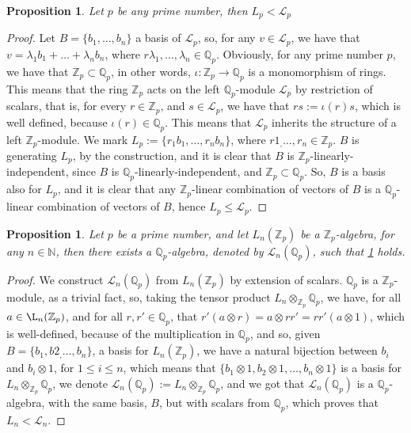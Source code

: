 \documentclass[12pt]{article}
\newtheorem{proposition}[theorem]{Proposition}
\begin{document}
\begin{proposition}
\label{prop.integers.subalgebra.rationals}
Let $p$ be any prime number, then $L_p<\mathcal{L}_p$
\end{proposition}
\begin{proof}
Let $B=\{b_1,\dots,b_n\}$ a basis of $\mathcal{L}_p$, so, for any $v\in\mathcal{L}_p$, we have that $v=\lambda_1b_1+\dots+\lambda_nb_n$, where $r\lambda_1,\dots,\lambda_n\in\mathbb{Q}_p$. Obviously, for any prime number $p$, we have that $\mathbb{Z}_p\subset\mathbb{Q}_p$, in other words, $\iota:\mathbb{Z}_p\rightarrow\mathbb{Q}_p$ is a monomorphism of rings. This means that the ring $\mathbb{Z}_p$ acts on the left $\mathbb{Q}_p$-module $\mathcal{L}_p$ by restriction of scalars, that is, for every $r\in\mathbb{Z}_p$, and $s\in\mathcal{L}_p$, we have that $rs:=\iota(r)s$, which is well defined, because $\iota(r)\in\mathbb{Q}_p$. This means that $\mathcal{L}_p$ inherits the structure of a left $\mathbb{Z}_p$-module. We mark $L_p:=\{r_1b_1,\dots,r_nb_n\}$, where $r1_,
\dots,r_n\in\mathbb{Z}_p$. $B$ is generating $L_p$, by the construction, and it is clear that $B$ is $\mathbb{Z}_p$-linearly-independent, since $B$ is $\mathbb{Q}_p$-linearly-independent, and $\mathbb{Z}_p\subset\mathbb{Q}_p$. So, $B$ is a basis also for $L_p$, and it is clear that any $\mathbb{Z}_p$-linear combination of vectors of $B$ is a $\mathbb{Q}_p$-linear combination of vectors of $B$, hence $L_p\leq\mathcal{L}_p$.
\end{proof}
\begin{proposition}
\label{prop.padic.field.algebra}
Let $p$ be a prime number, and let $L_n(\mathbb{Z}_p)$ be a $\mathbb{Z}_p$-algebra, for any $n\in\mathbb{N}$, then there exists a $\mathbb{Q}_p$-algebra, denoted by $\mathcal{L}_n(\mathbb{Q}_p)$, such that \ref{prop.integers.subalgebra.rationals} holds.
\end{proposition}
\begin{proof}
We construct $\mathcal{L}_n(\mathbb{Q}_p)$ from $L_n(\mathbb{Z}_p)$ by extension of scalars. $\mathbb{Q}_p$ is a $\mathbb{Z}_p$-module, as a trivial fact, so, taking the tensor product $L_n\otimes_{\mathbb{Z}_p}\mathbb{Q}_p$, we have, for all $a\in\L_n(\mathbb{Z}_p)$, and for all $r,r'\in\mathbb{Q}_p$, that $r'(a\otimes r)=a\otimes rr'=rr'(a\otimes 1)$, which is well-defined, because of the multiplication in $\mathbb{Q}_p$, and so, given $B=\{b_1,b2_,\dots,b_n\}$, a basis for $L_n(\mathbb{Z}_p)$, we have a natural bijection between $b_i$ and $b_i\otimes 1$, for $1\leq i\leq n$, which means that $\{b_1\otimes 1,b_2\otimes 1,\dots,b_n\otimes 1\}$ is a basis for $L_n\otimes_{\mathbb{Z}_p} \mathbb{Q}_p$, we denote $\mathcal{L}_n(\mathbb{Q}_p):=L_n\otimes_{\mathbb{Z}_p} \mathbb{Q}_p$, and we got that $\mathcal{L}_n(\mathbb{Q}_p)$ is a $\mathbb{Q}_p$-algebra, with the same basis, $B$, but with scalars from $\mathbb{Q}_p$, which proves that $L_n<\mathcal{L}_n$.
\end{proof}
\end{document}
